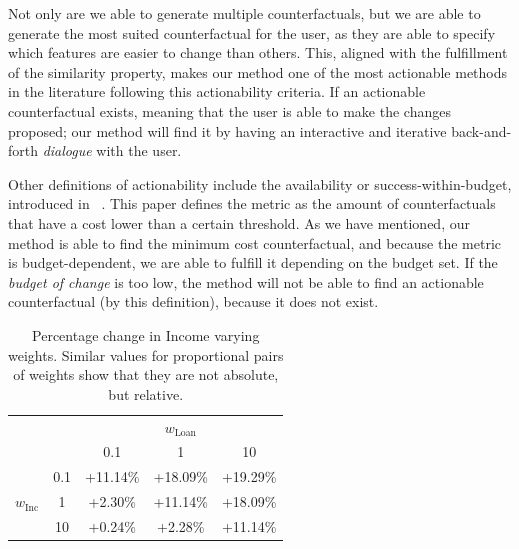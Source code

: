 \documentclass[12pt]{extarticle}
\numberwithin{equation}{section}
\begin{document}
Not only are we able to generate multiple counterfactuals, but we are able to generate the most suited counterfactual for the user, as they are able to specify which features are easier to change than others. This, aligned with the fulfillment of the similarity property, makes our method one of the most actionable methods in the literature following this actionability criteria. If an actionable counterfactual exists, meaning that the user is able to make the changes proposed; our method will find it by having an interactive and iterative back-and-forth \emph{dialogue} with the user.

Other definitions of actionability include the availability or success-within-budget, introduced in ~\cite{ustun2019actionable}. This paper defines the metric as the amount of counterfactuals that have a cost lower than a certain threshold. As we have mentioned, our method is able to find the minimum cost counterfactual, and because the metric is budget-dependent, we are able to fulfill it depending on the budget set. If the \emph{budget of change} is too low, the method will not be able to find an actionable counterfactual (by this definition), because it does not exist.


\begin{table}[ht]
    \centering
    \begin{tabular}{cc|ccc}
             &                 & \multicolumn{3}{c}{$w_{\text{Loan}}$} \\
     & & 0.1 & 1 & 10 \\
     \cmidrule(l){1-5}
    \multirow{3}{*}{$w_{\text{Inc}}$}
             & 0.1 & +11.14\% & +18.09\% & +19.29\% \\
             & 1   &  +2.30\% & +11.14\% & +18.09\% \\
             & 10  &  +0.24\% &  +2.28\% & +11.14\% \\
    \bottomrule
\end{tabular}

    \caption{Percentage change in Income varying weights. Similar values for proportional pairs of weights show that they are not absolute, but relative.}
    \label{tab:delta_income}
\end{table}
    
\end{document}
